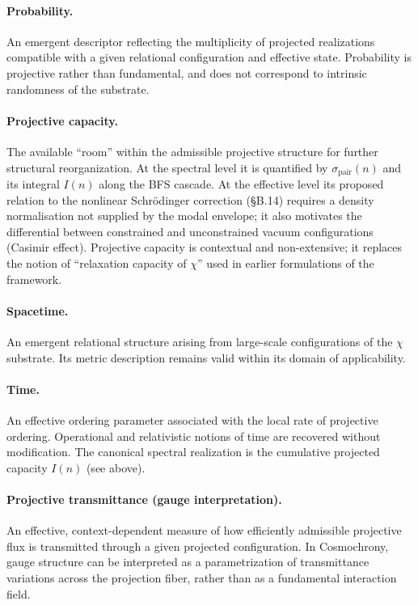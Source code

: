   \paragraph{Probability.}
    An emergent descriptor reflecting the multiplicity of projected realizations
    compatible with a given relational configuration and effective state.
    Probability is projective rather than fundamental, and does not correspond
    to intrinsic randomness of the substrate.

  \paragraph{Projective capacity.}
    The available ``room'' within the admissible projective structure for
    further structural reorganization.
    At the spectral level it is quantified by $\sigma_{\mathrm{pair}}(n)$
    and its integral $I(n)$ along the BFS cascade.
    At the effective level its proposed relation to the nonlinear Schrödinger correction (§B.14)
    requires a density normalisation not supplied by the modal envelope; it also motivates the differential between
    constrained and unconstrained vacuum configurations (Casimir effect).
    Projective capacity is contextual and non-extensive; it replaces the
    notion of ``relaxation capacity of $\chi$'' used in earlier formulations
    of the framework.

  \paragraph{Spacetime.}
    An emergent relational structure arising from large-scale configurations of
    the $\chi$ substrate.
    Its metric description remains valid within its domain of applicability.

  \paragraph{Time.}
    An effective ordering parameter associated with the local rate of projective
    ordering.
    Operational and relativistic notions of time are recovered without modification.
    The canonical spectral realization is the cumulative projected capacity
    $I(n)$ (see above).

  \paragraph{Projective transmittance (gauge interpretation).}
    An effective, context-dependent measure of how efficiently admissible projective
    flux is transmitted through a given projected configuration.
    In Cosmochrony, gauge structure can be interpreted as a parametrization of
    transmittance variations across the projection fiber, rather than as a fundamental
    interaction field.

